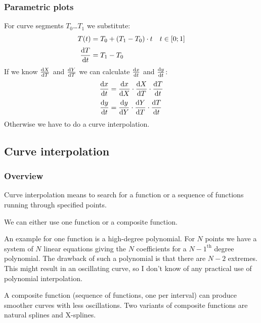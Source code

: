 \documentclass[origlongtable]{scrartcl}
\begin{document}
\subsubsection{Parametric plots}
For curve segments \(T_0\)\ldots\(T_1\) we substitute:
\begin{align*}
T(t)&=T_0+(T_1-T_0)\cdot t&t&\in[0;1]\\[0.2em]
\frac{\mathrm{d} T}{\mathrm{d} t}&=T_1-T_0\end{align*}
If we know \(\tfrac{\mathrm{d} X}{\mathrm{d} T}\) and
\(\tfrac{\mathrm{d} Y}{\mathrm{d} T}\) we can calculate
\(\tfrac{\mathrm{d} x}{\mathrm{d} t}\)
and \(\tfrac{\mathrm{d} y}{\mathrm{d} t}\):
\begin{align*}
\frac{\mathrm{d} x}{\mathrm{d} t}&=\frac{\mathrm{d} x}{\mathrm{d} X}\cdot\frac{\mathrm{d} X}{\mathrm{d} T}\cdot\frac{\mathrm{d} T}{\mathrm{d} t}\\[0.2em]
\frac{\mathrm{d} y}{\mathrm{d} t}&=\frac{\mathrm{d} y}{\mathrm{d} Y}\cdot\frac{\mathrm{d} Y}{\mathrm{d} T}\cdot\frac{\mathrm{d} T}{\mathrm{d} t}
\end{align*}
Otherwise we have to do a curve interpolation.
\clearpage
\subsection{Curve interpolation}\label{sec:interpolation}
\subsubsection{Overview}
Curve interpolation means to search for a function or a sequence of
functions running through specified points.

We can either use one function or a composite function.

An example for one function is a high-degree polynomial.
For \(N\) points we have a system of \(N\) linear equations giving
the \(N\) coefficients for a \({N-1}^{\text{th}}\) degree polynomial.
The drawback of such a polynomial is that there are \(N-2\) extremes.
This might result in an oscillating curve, so I don't know of any
practical use of polynomial interpolation.

A composite function (sequence of functions, one per interval) can
produce smoother curves with less oscillations.
Two variants of composite functions are natural splines and X-splines.
\end{document}
